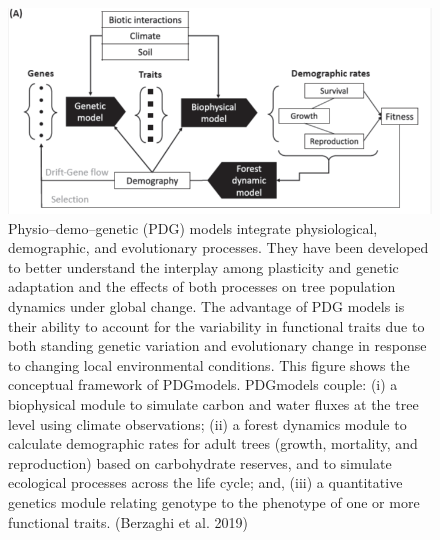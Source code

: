\documentclass[
  12pt,
  oneside]{book}
\begin{document}
\begin{figure}

{\centering \includegraphics[width=0.8\linewidth]{figures/chap7/f718_berzaghi} 

}

\caption{Physio–demo–genetic (PDG) models integrate physiological, demographic, and evolutionary processes. They have been developed to better understand the interplay among plasticity and genetic adaptation and the effects of both processes on tree population dynamics under global change. The advantage of PDG models is their ability to account for the variability in functional traits due to both standing genetic variation and evolutionary change in response to changing local environmental conditions. This figure shows the conceptual framework of PDGmodels. PDGmodels couple: (i) a biophysical module to simulate carbon and water fluxes at the tree level using climate observations; (ii) a forest dynamics module to calculate demographic rates for adult trees (growth, mortality, and reproduction) based on carbohydrate reserves, and to simulate ecological processes across the life cycle; and, (iii) a quantitative genetics module relating genotype to the phenotype of one or more functional traits. (Berzaghi et al. 2019)}\label{fig:f718}
\end{figure}
\end{document}
